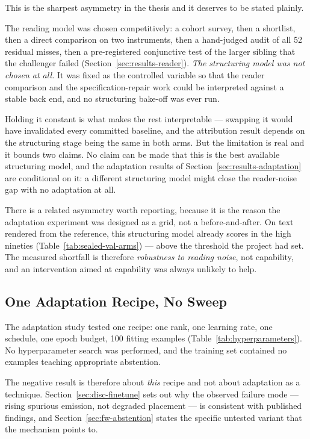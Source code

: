 This is the sharpest asymmetry in the thesis and it deserves to be stated plainly.

The reading model was chosen competitively: a cohort survey, then a shortlist, then a direct
comparison on two instruments, then a hand-judged audit of all 52 residual misses, then a
pre-registered conjunctive test of the larger sibling that the challenger failed
(Section~\ref{sec:results-reader}). \emph{The structuring model was not chosen at all.} It was fixed
as the controlled variable so that the reader comparison and the specification-repair work could
be interpreted against a stable back end, and no structuring bake-off was ever run.

Holding it constant is what makes the rest interpretable --- swapping it would have invalidated
every committed baseline, and the attribution result depends on the structuring stage being the
same in both arms. But the limitation is real and it bounds two claims. No claim can be made that
this is the best available structuring model, and the adaptation results of
Section~\ref{sec:results-adaptation} are conditional on it: a different structuring model might close
the reader-noise gap with no adaptation at all.

There is a related asymmetry worth reporting, because it is the reason the adaptation experiment
was designed as a grid, not a before-and-after. On text rendered from the reference, this
structuring model already scores in the high nineties (Table~\ref{tab:sealed-val-arms}) --- above
the threshold the project had set. The measured shortfall is therefore \emph{robustness to
reading noise}, not capability, and an intervention aimed at capability was always unlikely to
help.

\subsection{One Adaptation Recipe, No Sweep}
\label{sec:lim-finetune}

The adaptation study tested one recipe: one rank, one learning rate, one schedule, one epoch
budget, 100 fitting examples (Table~\ref{tab:hyperparameters}). No hyperparameter search was
performed, and the training set contained no examples teaching appropriate abstention.

The negative result is therefore about \emph{this} recipe and not about adaptation as a
technique. Section~\ref{sec:disc-finetune} sets out why the observed failure mode --- rising spurious
emission, not degraded placement --- is consistent with published findings, and
Section~\ref{sec:fw-abstention} states the specific untested variant that the mechanism points to.

